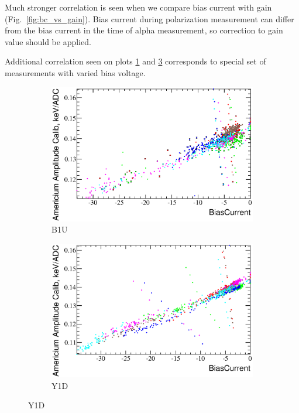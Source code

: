\documentclass[a4paper,12pt]{article}
\begin{document}
Much stronger correlation is seen when we compare bias current with gain
(Fig.~\ref{fig:bc_vs_gain}).  Bias current during polarization measurement can
differ from the bias current in the time of alpha measurement, so correction to
gain value should be applied.

Additional correlation seen on plots \ref{bc_vs_gain-b1u} and
\ref{bc_vs_gain-y1d} corresponds to special set of measurements with varied bias
voltage.


\newcommand\bcvsgainlabel{Bias current versus americium gain ($E_{\text{Am}} /
\mu_{\text{Am}}$) dependency. The colors represent different detectors.}
\begin{figure}[p]
\begin{subfigure}[b]{0.5\textwidth}
\includegraphics[width=\textwidth]{gfx/run13_alpha_study/B1U/c_hBiasCurrent_AmGain.eps}
\caption{B1U}\label{bc_vs_gain-b1u}
\end{subfigure}
\begin{subfigure}[b]{0.5\textwidth}
\includegraphics[width=\textwidth]{gfx/run13_alpha_study/Y1D/c_hBiasCurrent_AmGain.eps}
\caption{Y1D}\label{bc_vs_gain-y1d}
\end{subfigure}


\end{figure}
\end{document}
